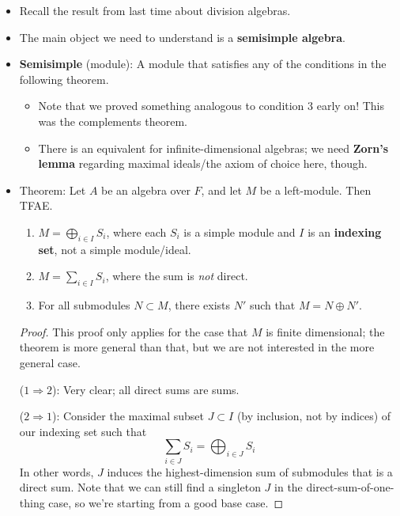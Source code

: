 \documentclass[../notes.tex]{subfiles}
\begin{document}
\begin{itemize}
\begin{itemize}
    \end{itemize}
    \item Recall the result from last time about division algebras.
    \item The main object we need to understand is a \textbf{semisimple algebra}.
    \item \textbf{Semisimple} (module): A module that satisfies any of the conditions in the following theorem.
    \begin{itemize}
        \item Note that we proved something analogous to condition 3 early on! This was the complements theorem.
        \item There is an equivalent for infinite-dimensional algebras; we need \textbf{Zorn's lemma} regarding maximal ideals/the axiom of choice here, though.
    \end{itemize}
    \item Theorem: Let $A$ be an algebra over $F$, and let $M$ be a left-module. Then TFAE.
    \begin{enumerate}
        \item $M=\bigoplus_{i\in I}S_i$, where each $S_i$ is a simple module and $I$ is an \textbf{indexing set}, not a simple module/ideal.
        \item $M=\sum_{i\in I}S_i$, where the sum is \emph{not} direct.
        \item For all submodules $N\subset M$, there exists $N'$ such that $M=N\oplus N'$.
    \end{enumerate}
    \begin{proof}
        This proof only applies for the case that $M$ is finite dimensional; the theorem is more general than that, but we are not interested in the more general case.\par\smallskip
        ($1\Rightarrow 2$): Very clear; all direct sums are sums.\par\smallskip
        ($2\Rightarrow 1$): Consider the maximal subset $J\subset I$ (by inclusion, not by indices) of our indexing set such that
        \begin{equation*}
            \sum_{i\in J}S_i = \bigoplus_{i\in J}S_i
        \end{equation*}
        In other words, $J$ induces the highest-dimension sum of submodules that is a direct sum. Note that we can still find a singleton $J$ in the direct-sum-of-one-thing case, so we're starting from a good base case.\par

\end{proof}
\end{itemize}
\end{document}
